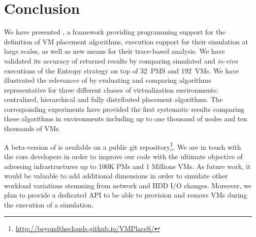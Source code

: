 \section{Conclusion}
\label{sec:conclusion}
We have presented
\vmps, a framework providing programming support for the definition of
VM placement algorithms, execution support for their simulation at
large scales, as well as new means for their trace-based analysis.
We have validated its accuracy of returned results by
comparing simulated and \textit{in-vivo} executions of the Entropy
strategy on top of 32~PMS and 192~VMs. We have illustrated the
relevancce of \vmps by evaluating and comparing algorithms
representative for three different classes of virtualization
environments: centralized, hierarchical and fully distributed
placement algorithms.
The corresponding experiments have provided the first systematic results
comparing these algorithms in environments including up to one
thousand of nodes and ten thousands of VMs.

A beta-version of \vmps is available on a public git
repository\footnote{\url{http://beyondtheclouds.github.io/VMPlaceS/}}.
We are in touch with the \sg core developers in order to improve our
code with the ultimate objective of adressing infrastructures up to
100K PMs and 1 Millions VMs. As future work, it would be valuable to add
additional dimensions in order to simulate other workload variations
stemming from network and HDD I/O changes. Moreover,
we plan to provide a dedicated API to be able to
provision and remove VMs during the execution of a simulation.
